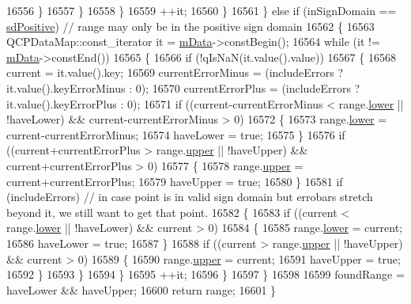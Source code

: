 \begin{DoxyCode}
16556           \}
16557         \}
16558       \}
16559       ++it;
16560     \}
16561   \} \textcolor{keywordflow}{else} \textcolor{keywordflow}{if} (inSignDomain == \hyperlink{class_q_c_p_abstract_plottable_a661743478a1d3c09d28ec2711d7653d8a02951859f243a4d24e779cfbb5471030}{sdPositive}) \textcolor{comment}{// range may only be in the positive sign domain}
16562   \{
16563     QCPDataMap::const\_iterator it = \hyperlink{class_q_c_p_graph_a8457c840f69a0ac49f61d30a509c5d08}{mData}->constBegin();
16564     \textcolor{keywordflow}{while} (it != \hyperlink{class_q_c_p_graph_a8457c840f69a0ac49f61d30a509c5d08}{mData}->constEnd())
16565     \{
16566       \textcolor{keywordflow}{if} (!qIsNaN(it.value().value))
16567       \{
16568         current = it.value().key;
16569         currentErrorMinus = (includeErrors ? it.value().keyErrorMinus : 0);
16570         currentErrorPlus = (includeErrors ? it.value().keyErrorPlus : 0);
16571         \textcolor{keywordflow}{if} ((current-currentErrorMinus < range.\hyperlink{class_q_c_p_range_aa3aca3edb14f7ca0c85d912647b91745}{lower} || !haveLower) && current-currentErrorMinus > 0)
16572         \{
16573           range.\hyperlink{class_q_c_p_range_aa3aca3edb14f7ca0c85d912647b91745}{lower} = current-currentErrorMinus;
16574           haveLower = \textcolor{keyword}{true};
16575         \}
16576         \textcolor{keywordflow}{if} ((current+currentErrorPlus > range.\hyperlink{class_q_c_p_range_ae44eb3aafe1d0e2ed34b499b6d2e074f}{upper} || !haveUpper) && current+currentErrorPlus > 0)
16577         \{
16578           range.\hyperlink{class_q_c_p_range_ae44eb3aafe1d0e2ed34b499b6d2e074f}{upper} = current+currentErrorPlus;
16579           haveUpper = \textcolor{keyword}{true};
16580         \}
16581         \textcolor{keywordflow}{if} (includeErrors) \textcolor{comment}{// in case point is in valid sign domain but errobars stretch beyond it, we
       still want to get that point.}
16582         \{
16583           \textcolor{keywordflow}{if} ((current < range.\hyperlink{class_q_c_p_range_aa3aca3edb14f7ca0c85d912647b91745}{lower} || !haveLower) && current > 0)
16584           \{
16585             range.\hyperlink{class_q_c_p_range_aa3aca3edb14f7ca0c85d912647b91745}{lower} = current;
16586             haveLower = \textcolor{keyword}{true};
16587           \}
16588           \textcolor{keywordflow}{if} ((current > range.\hyperlink{class_q_c_p_range_ae44eb3aafe1d0e2ed34b499b6d2e074f}{upper} || !haveUpper) && current > 0)
16589           \{
16590             range.\hyperlink{class_q_c_p_range_ae44eb3aafe1d0e2ed34b499b6d2e074f}{upper} = current;
16591             haveUpper = \textcolor{keyword}{true};
16592           \}
16593         \}
16594       \}
16595       ++it;
16596     \}
16597   \}
16598   
16599   foundRange = haveLower && haveUpper;
16600   \textcolor{keywordflow}{return} range;
16601 \}
\end{DoxyCode}
\hypertarget{class_q_c_p_graph_ae3d82ffd0c9a883482aabf47b0e6b5ee}{}

